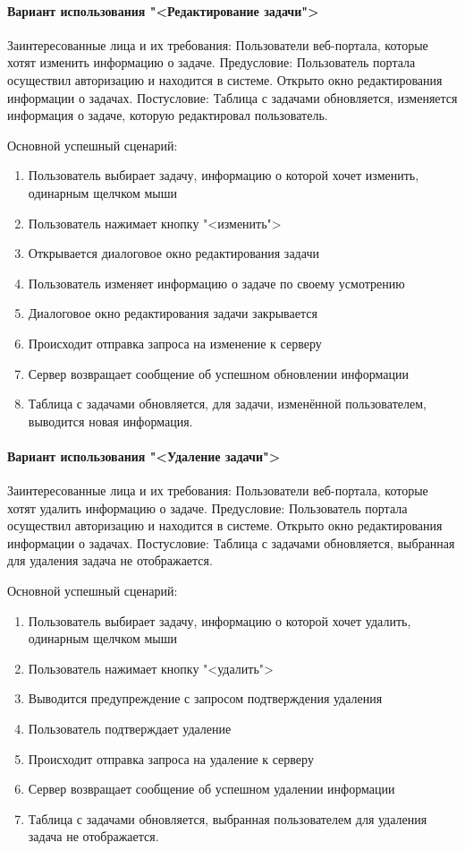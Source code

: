 \paragraph{Вариант использования "<Редактирование задачи">}
Заинтересованные лица и их требования: Пользователи веб-портала, которые хотят изменить информацию о задаче.
Предусловие: Пользователь портала осуществил авторизацию и находится в системе. Открыто окно редактирования информации о задачах.
Постусловие: Таблица с задачами обновляется, изменяется информация о задаче, которую редактировал пользователь.

Основной успешный сценарий:
\begin{enumerate}
	\item Пользователь выбирает задачу, информацию о которой хочет изменить, одинарным щелчком мыши
	\item Пользователь нажимает кнопку "<изменить">
	\item Открывается диалоговое окно редактирования задачи
	\item Пользователь изменяет информацию о задаче по своему усмотрению
	\item Диалоговое окно редактирования задачи закрывается
	\item Происходит отправка запроса на изменение к серверу 
	\item Сервер возвращает сообщение об успешном обновлении информации
	\item Таблица с задачами обновляется, для задачи, изменённой пользователем, выводится новая информация.
\end{enumerate}

\paragraph{Вариант использования "<Удаление задачи">}
Заинтересованные лица и их требования: Пользователи веб-портала, которые хотят удалить информацию о задаче.
Предусловие: Пользователь портала осуществил авторизацию и находится в системе. Открыто окно редактирования информации о задачах.
Постусловие: Таблица с задачами обновляется, выбранная для удаления задача не отображается.

Основной успешный сценарий:
\begin{enumerate}
	\item Пользователь выбирает задачу, информацию о которой хочет удалить, одинарным щелчком мыши
	\item Пользователь нажимает кнопку "<удалить">
	\item Выводится предупреждение с запросом подтверждения удаления
	\item Пользователь подтверждает удаление
	\item Происходит отправка запроса на удаление к серверу 
	\item Сервер возвращает сообщение об успешном удалении информации
	\item Таблица с задачами обновляется, выбранная пользователем для удаления задача не отображается.
\end{enumerate}

